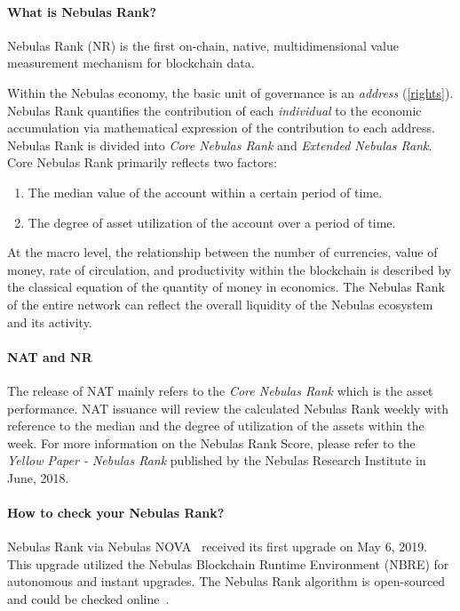 \begin{center}
\colorbox{yellow!30}{
\begin{minipage}[c]{.8\textwidth}
	\paragraph{What is Nebulas Rank?}
	Nebulas Rank (NR) is the first on-chain, native, multidimensional value measurement mechanism for blockchain data.

  Within the Nebulas economy, the basic unit of governance is an \emph{address}
  (\ref{rights}). Nebulas Rank quantifies the contribution of each
  \emph{individual} to the economic accumulation via mathematical expression of
  the contribution to each address. Nebulas Rank is divided into \emph{Core
  Nebulas Rank} and \emph{Extended Nebulas Rank}. Core Nebulas Rank primarily reflects two factors:

	\begin{enumerate}
		\item The median value of the account within a certain period of time.
		\item The degree of asset utilization of the account over a period of time.
	\end{enumerate}

	At the macro level, the relationship between the number of currencies, value of money, rate of circulation, and productivity within the blockchain is described by the classical equation of the quantity of money in economics. The Nebulas Rank of the entire network can reflect the overall liquidity of the Nebulas ecosystem and its activity.


	\paragraph{NAT and NR}

  The release of NAT mainly refers to the \emph{Core Nebulas Rank} which is the asset performance. NAT issuance will review the calculated Nebulas Rank weekly with reference to the median and the degree of utilization of the assets within the week. For more information on the Nebulas Rank Score, please refer to the \textit{Yellow Paper - Nebulas Rank} published by the Nebulas Research Institute in June, 2018.


	\paragraph{How to check your Nebulas Rank?}

Nebulas Rank via Nebulas NOVA~\cite{nova} received its first upgrade on May 6, 2019. This upgrade utilized the Nebulas Blockchain Runtime Environment (NBRE) for autonomous and instant upgrades. The Nebulas Rank algorithm is open-sourced and could be checked online~\cite{CheckNR}.


\end{minipage}}
\end{center}

